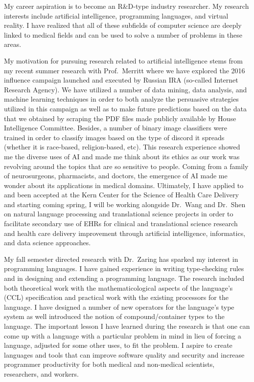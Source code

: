 \documentclass[a4paper,12pt,sans]{moderncv}
\date{January 11, 2020}
\begin{document}
\makelettertitle%

\justify%

My career aspiration is to become an R\&D-type industry researcher. My research
interests include artificial intelligence, programming languages, and virtual
reality. I have realized that all of these subfields of computer science are
deeply linked to medical fields and can be used to solve a number of problems
in these areas.

My motivation for pursuing research related to artificial intelligence stems
from my recent summer research with Prof.~Merritt where we have explored the
2016 influence campaign launched and executed by Russian IRA (so-called
Internet Research Agency). We have utilized a number of data mining, data
analysis, and machine learning techniques in order to both analyze the
persuasive strategies utilized in this campaign as well as to make future
predictions based on the data that we obtained by scraping the PDF files made
publicly available by House Intelligence Committee. Besides, a number of binary
image classifiers were trained in order to classify images based on the type of
discord it spreads (whether it is race-based, religion-based, etc).  This
research experience showed me the diverse uses of AI and made me think about
its ethics as our work was revolving around the topics that are so sensitive to
people. Coming from a family of neurosurgeons, pharmacists, and doctors, the
emergence of AI made me wonder about its applications in medical domains.
Ultimately, I have applied to and been accepted at the Kern Center for the
Science of Health Care Delivery and starting coming spring, I will be working
alongside Dr.~Wang and Dr.~Shen on natural language processing and
translational science projects in order to facilitate secondary use of EHRs for
clinical and translational science research and health care delivery
improvement through artificial intelligence, informatics, and data science
approaches.

My fall semester directed research with Dr.~Zaring has sparked my interest in
programming languages. I have gained experience in writing type-checking rules
and in designing and extending a programming language. The research included
both theoretical work with the mathematicological aspects of the language's
(CCL) specification and practical work with the existing processors for the
language. I have designed a number of new operators for the language's type
system as well introduced the notion of compound/container types to the
language. The important lesson I have learned during the research is that one
can come up with a language with a particular problem in mind in lieu of
forcing a language, adjusted for some other uses, to fit the problem. I aspire
to create languages and tools that can improve software quality and security
and increase programmer productivity for both medical and non-medical
scientists, researchers, and workers.
\end{document}
